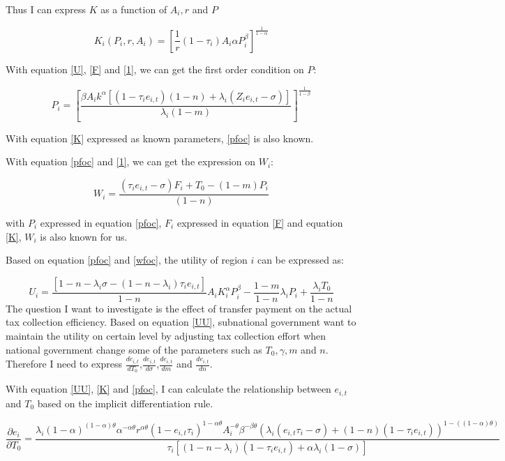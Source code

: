 Thus I can express $K$ as a function of $A_i, r$ and $P$

\begin{equation}
    K_i(P_i,r,A_i)=[\frac{1}{r}(1-\tau_i)A_i\alpha P_i^\beta]^\frac{1}{1-\alpha}\label{K}
\end{equation}

With equation \ref{U}, \ref{F} and \ref{1}, we can get the first order condition on $P$:

\begin{equation}
    P_i=\left[\frac{\beta A_i k^\alpha\left[\left(1-\tau_i e_{i, t}\right)(1-n)+\lambda_i\left(Z_i e_{i, t}-\sigma\right)\right]}{\lambda_i(1-m)}\right]^{\frac{1}{1-\beta}} \label{pfoc}
\end{equation}

With equation \ref{K} expressed as known parameters, \ref{pfoc} is also known.

With equation \ref{pfoc} and \ref{1}, we can get the expression on $W_i$:

\begin{equation}
    W_i=\frac{\left(\tau_i e_{i, t}-\sigma\right) F_i+T_0-(1-m) P_i}{(1-n)}\label{wfoc}
\end{equation}

with $P_i$ expressed in equation \ref{pfoc}, $F_i$ expressed in equation \ref{F} and equation \ref{K}, $W_i$ is also known for us.

Based on equation \ref{pfoc} and \ref{wfoc}, the utility of region $i$ can be expressed as:

\begin{equation}
    U_i=\frac{\left[1-n-\lambda_i \sigma-\left(1-n-\lambda_i\right) \tau_i e_{i,t}\right]}{1-n} A_i K_i^\alpha P_i^\beta-\frac{1-m}{1-n} \lambda_i P_i+\frac{\lambda_i T_0}{1-n} \label{UU}
\end{equation}
The question I want to investigate is the effect of transfer payment on the actual tax collection efficiency. Based on equation \ref{UU}, subnational government want to maintain the utility on certain level by adjusting tax collection effort when national government change some of the parameters such as $T_0, \gamma, m $ and $n$. Therefore I need to express $\frac{d e_{i,t}}{d T_0}$,$\frac{d e_{i,t}}{d \sigma}$,$\frac{d e_{i,t}}{d m}$ and $\frac{d e_{i,t}}{d n}$.

With equation \ref{UU}, \ref{K} and \ref{pfoc}, I can calculate the relationship between $e_{i,t}$ and $T_0$ based on the implicit differentiation rule.

\begin{equation}
    \frac{\partial e_i}{\partial T_0}=\frac{\lambda_i  (1-\alpha )^{(1-\alpha ) \theta } \alpha ^{-\alpha  \theta } r^{\alpha \theta}(1-e_{i,t}\tau_i)^{1-\alpha \theta}A_i^{-\theta } \beta ^{-\beta  \theta }(\lambda_i  (e_{i,t} \tau_i -\sigma )+(1-n) (1- \tau_i e_{i,t} ))^{1-((1-\alpha ) \theta )}}{\tau_i  [(1-n-\lambda_i)(1-\tau_i e_{i,t})+\alpha \lambda_i(1-\sigma)]} \label{eandT0}
\end{equation}

